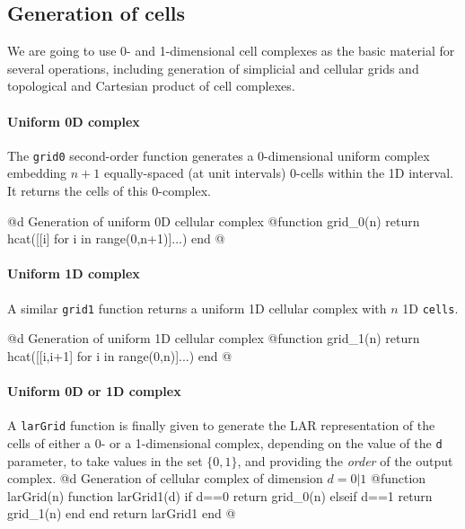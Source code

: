 \subsection{Generation of cells}

We are going to use 0- and 1-dimensional cell complexes as the basic material for several operations, including generation of simplicial and cellular grids and topological and Cartesian product of cell complexes. 


\paragraph{Uniform 0D complex}
The \texttt{grid0} second-order function generates a 0-dimensional uniform complex embedding $n+1$ equally-spaced (at unit intervals) 0-cells within the 1D interval. It returns the cells of this 0-complex.

@d Generation of uniform 0D cellular complex 
@{function grid_0(n)
    return hcat([[i] for i in range(0,n+1)]...)
end
@}

\paragraph{Uniform 1D complex}
A similar \texttt{grid1} function returns a uniform 1D cellular complex with $n$ 1D \texttt{cells}.

@d Generation of uniform 1D cellular complex 
@{function grid_1(n)
    return hcat([[i,i+1] for i in range(0,n)]...)
end
@}

\paragraph{Uniform 0D or 1D complex}
A \texttt{larGrid} function is finally given to generate the LAR representation of the cells of either a 0- or a 1-dimensional complex, depending on the value of the \texttt{d} parameter, to take values in the set $\{0,1\}$, and providing the \emph{order} of the output complex.
@d Generation of cellular complex of dimension $d = 0 | 1$
@{function larGrid(n)
    function larGrid1(d)
        if d==0 
        	return grid_0(n)
        elseif d==1 
        	return grid_1(n) 
        end
    end
    return larGrid1
end
@}


